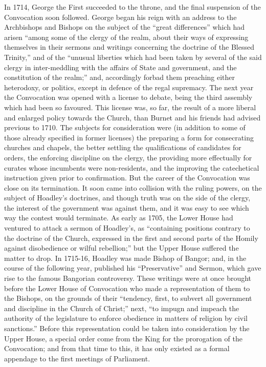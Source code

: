 In 1714, George the First
succeeded to the throne, and the final suspension of the Convocation
soon followed. George began his reign with an address to the
Archbishops and Bishops on the subject of the ``great differences''
which had arisen ``among some of the clergy of the realm, about their
ways of expressing themselves in their sermons and writings concerning
the doctrine of the Blessed Trinity,'' and of the ``unusual liberties
which had been taken by several of the said clergy in inter-meddling
with the affairs of State and government, and the constitution of the
realm;'' and, accordingly forbad them preaching either heterodoxy, or
politics, except in defence of the regal supremacy. The next year the
Convocation was opened with a license to debate, being the third
assembly which had been so favoured. This license was, so far, the
result of a more liberal and enlarged policy towards the Church, than
Burnet and his friends had advised previous to 1710. The subjects for
consideration were (in addition to some of those already specified in
former licenses) the preparing a form for consecrating churches and
chapels, the better settling the qualifications of candidates for
orders, the enforcing discipline on the clergy, the providing more
effectually for curates whose incumbents were non-residents, and the
improving the catechetical instruction given prior to
confirmation. But the career of the Convocation was close on its
termination. It soon came into collision with the ruling powers, on
the subject of Hoadley's doctrines, and though truth was on the side
of the clergy, the interest of the government was against them, and it
was easy to see which way the contest would terminate. As early as
1705, the Lower House had ventured to attack a sermon of Hoadley's, as
``containing positions contrary to the doctrine of the Church,
expressed in the first and second parts of the Homily against
disobedience or wilful rebellion;'' but the Upper House suffered the
matter to drop. In 1715-16, Hoadley was made Bishop of Bangor; and, in
the course of the following year, published his ``Preservative'' and
Sermon, which gave rise to the famous Bangorian controversy. These
writings were at once brought before the Lower House of Convocation
who made a representation of them to the Bishops, on the grounds of
their ``tendency, first, to subvert all government and discipline in
the Church of Christ;'' next, ``to impugn and impeach the authority of
the legislature to enforce obedience in matters of religion by civil
sanctions.'' Before this representation could be taken into
consideration by the Upper House, a special order come from the King
for the prorogation of the Convocation; and from that time to this, it
has only existed as a formal appendage to the first meetings of
Parliament.

